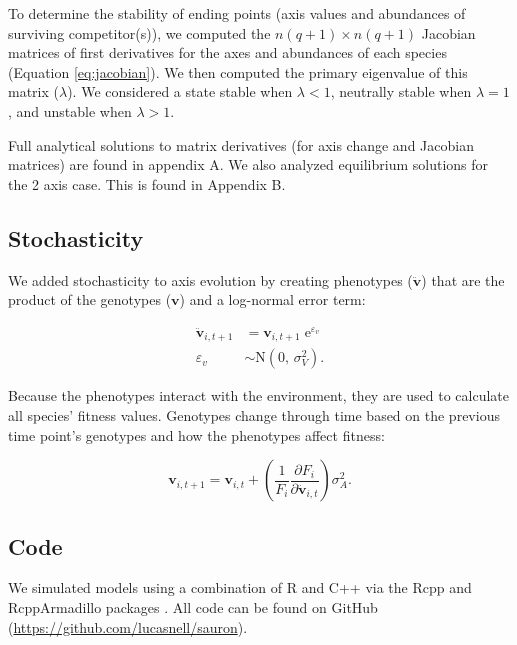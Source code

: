 To determine the stability of ending points (axis values and abundances of
surviving competitor(s)), we computed the $n (q+1) \times n (q+1)$ Jacobian matrices
of first derivatives for the axes and abundances of each species (Equation \ref{eq:jacobian}).
We then computed the primary eigenvalue of this matrix ($\lambda$).
We considered a state stable when $\lambda < 1$,
neutrally stable when $\lambda = 1$,
and unstable when $\lambda > 1$.

Full analytical solutions to matrix derivatives (for axis change and
Jacobian matrices) are found in appendix A.
We also analyzed equilibrium solutions for the 2 axis case.
This is found in Appendix B.


\subsection*{Stochasticity}

We added stochasticity to axis evolution by creating phenotypes
($\mathbf{\ddot{v}}$) that are the product of the
genotypes ($\mathbf{v}$) and a log-normal error term:

\begin{equation} \label{eq:V-stochasticity}
\begin{split}
    \mathbf{\ddot{v}}_{i,t+1} &= \mathbf{v}_{i,t+1} \; \text{e}^{\varepsilon_v} \\
    \varepsilon_v &\sim \text{N}(0, \, \sigma^2_V)
    \text{.}
\end{split}
\end{equation}

Because the phenotypes interact with the environment, they are used
to calculate all species' fitness values.
Genotypes change through time based on the previous time point's 
genotypes and how the phenotypes affect fitness:

\begin{equation} \label{eq:axis-change-stochastic}
    \mathbf{v}_{i,t+1} = \mathbf{v}_{i,t} + \left( \frac{1}{F_i}
        \frac{\partial F_i}{\partial \mathbf{\ddot{v}}_{i,t}} \right) \sigma^2_A
    \textrm{.}
\end{equation}





% 
% 


\subsection*{Code}

We simulated models using a combination of R \citep{RCoreTeam2020} and
C++ via the Rcpp and RcppArmadillo packages
\citep{Eddelbuettel2014a,Eddelbuettel2013a,Sanderson2016}.
All code can be found on GitHub
(\url{https://github.com/lucasnell/sauron}).



